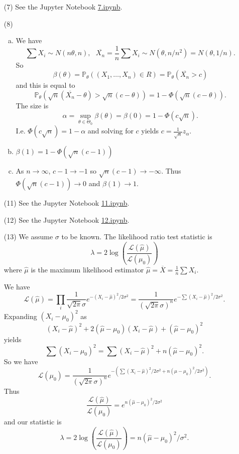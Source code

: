 \documentclass[10pt]{article}
\renewcommand{\P}{\mathbb{P}}
\begin{document}
\begin{enumerate}
\item[(7)]
See the Jupyter Notebook
\href{https://github.com/ajrasmus/some_of_statistics/blob/main/chapter_10/7.ipynb}{7.ipynb}.

\item[(8)]
\begin{enumerate}[(a)]
\item
We have
\[
\sum X_i \sim N(n\theta, n), \ \ \
\overline{X_n} = \frac{1}{n} \sum X_i \sim N(\theta, n/n^2) = N(\theta, 1/n).
\]
So
\[
\beta(\theta)=\P_\theta((X_1,\ldots,X_n) \in R) = \P_\theta(\overline{X_n} > c)
\]
and this is equal to
\[
\P_\theta(\sqrt{n}(\overline{X_n} - \theta) > \sqrt{n}(c-\theta))
= 1 - \Phi(\sqrt{n}(c-\theta)).
\]
The size is
\[
\alpha = \sup_{\theta \in \Theta_0} \beta(\theta) = \beta(0) =
1- \Phi(c\sqrt{n}).
\]
I.e. $\Phi(c\sqrt{n})=1-\alpha$ and solving for $c$ yields
$c=\frac{1}{\sqrt{n}}z_\alpha$.
\item
$\beta(1) = 1-\Phi(\sqrt{n}(c-1))$

\item
As $n\to \infty$, $c-1\to -1$ so $\sqrt{n}(c-1)\to -\infty$. Thus
\\ $\Phi(\sqrt{n}(c-1))\to 0$ and $\beta(1)\to 1$.
\end{enumerate}

\item[(11)]
See the Jupyter Notebook
\href{https://github.com/ajrasmus/some_of_statistics/blob/main/chapter_10/11.ipynb}{11.ipynb}.

\item[(12)]
See the Jupyter Notebook
\href{https://github.com/ajrasmus/some_of_statistics/blob/main/chapter_10/12.ipynb}{12.ipynb}.

\item[(13)]
We assume $\sigma$ to be known.
The likelihood ratio test statistic is
\[
\lambda = 2 \log \left( \frac{\mathcal L(\hat\mu)}{\mathcal L(\mu_0)}\right)
\]
where $\hat \mu$ is the maximum likelihood estimator
$\hat \mu = \overline X = \frac{1}{n}\sum X_i$.

We have
\[
\mathcal L(\hat\mu) = \prod_i \frac{1}{\sqrt{2\pi}\sigma}e^{-(X_i-\hat\mu)^2/2\sigma^2}
= \frac{1}{(\sqrt{2\pi}\sigma)^n}e^{-\sum(X_i-\hat\mu)^2/2\sigma^2}.
\]
Expanding $(X_i-\mu_0)^2$ as
\[
(X_i-\hat\mu)^2+2(\hat\mu-\mu_0)(X_i-\hat\mu) +(\hat\mu-\mu_0)^2
\]
yields
\[
\sum (X_i-\mu_0)^2 = \sum (X_i-\hat \mu)^2 + n(\hat\mu -\mu_0)^2.
\]
So we have
\[
\mathcal L(\mu_0) =
\frac{1}{(\sqrt{2\pi}\sigma)^n} e^{-\left(\sum (X_i-\hat\mu)^2/2\sigma^2 +
n(\hat\mu-\mu_0)^2/2\sigma^2\right)}.
\]
Thus
\[
\frac{\mathcal L(\hat\mu)}{\mathcal L(\mu_0)}=e^{n(\hat\mu-\mu_0)^2/2\sigma^2}
\]
and our statistic is
\[
\lambda = 2 \log \left( \frac{\mathcal L(\hat\mu)}{\mathcal L(\mu_0)}\right)=
n(\hat\mu-\mu_0)^2/\sigma^2.
\]


\end{enumerate}
\end{document}
